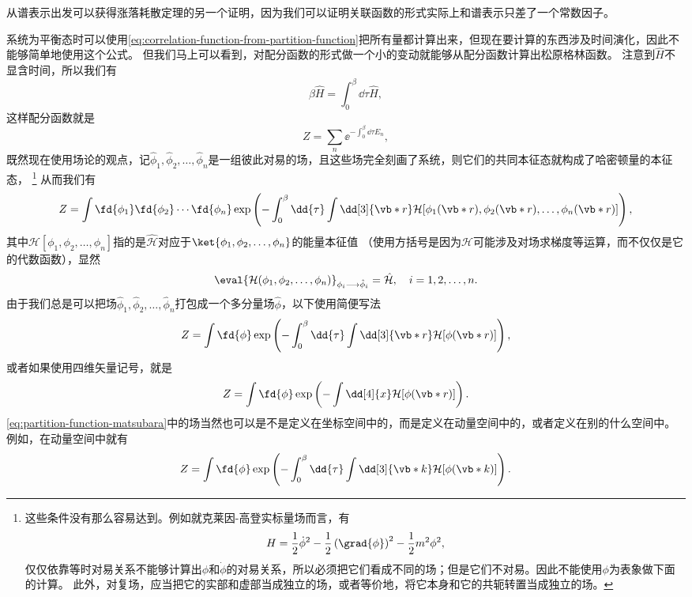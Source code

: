 从谱表示出发可以获得涨落耗散定理的另一个证明，因为我们可以证明关联函数的形式实际上和谱表示只差了一个常数因子。


系统为平衡态时可以使用\eqref{eq:correlation-function-from-partition-function}把所有量都计算出来，但现在要计算的东西涉及时间演化，因此不能够简单地使用这个公式。
但我们马上可以看到，对配分函数的形式做一个小的变动就能够从配分函数计算出松原格林函数。
注意到$\hat{H}$不显含时间，所以我们有
\[
    \beta \hat{H} = \int_0^\beta \dd{\tau} \hat{H},
\]
这样配分函数就是
\[
    Z = \sum_n \ee^{- \int_0^\beta \dd{\tau} E_n},
\]
既然现在使用场论的观点，记$\hat{\phi}_1, \hat{\phi}_2, \ldots, \hat{\phi}_n$是一组彼此对易的场，且这些场完全刻画了系统，则它们的共同本征态就构成了哈密顿量的本征态，%
\footnote{这些条件没有那么容易达到。例如就克莱因-高登实标量场而言，有
\[
    H = \frac{1}{2} \dot{\phi}^2 - \frac{1}{2} \left( \grad{\phi} \right)^2 - \frac{1}{2} m^2 \phi^2,
\]
仅仅依靠等时对易关系不能够计算出$\phi$和$\dot{\phi}$的对易关系，所以必须把它们看成不同的场；但是它们不对易。因此不能使用$\phi$为表象做下面的计算。
此外，对复场，应当把它的实部和虚部当成独立的场，或者等价地，将它本身和它的共轭转置当成独立的场。
}%
从而我们有
\begin{equation}
    Z = \int \fd{\phi_1} \fd{\phi_2} \cdots \fd{\phi_n}  \exp \left( - \int_0^\beta \dd{\tau} \int \dd[3]{\vb*{r}} \mathcal{H}[\phi_1(\vb*{r}), \phi_2(\vb*{r}), \ldots, \phi_n(\vb*{r})] \right),
\end{equation}
其中$\mathcal{H}[\phi_1, \phi_2, \ldots, \phi_n]$指的是$\hat{\mathcal{H}}$对应于$\ket{\phi_1, \phi_2, \ldots, \phi_n}$的能量本征值
（使用方括号是因为$\mathcal{H}$可能涉及对场求梯度等运算，而不仅仅是它的代数函数），显然
\[
    \eval{\mathcal{H}(\phi_1, \phi_2, \ldots, \phi_n)}_{\phi_i \longrightarrow \hat{\phi}_i} = \hat{\mathcal{H}}, \quad i = 1, 2, \ldots, n.
\]
由于我们总是可以把场$\hat{\phi}_1, \hat{\phi}_2, \ldots, \hat{\phi}_n$打包成一个多分量场$\hat{\phi}$，以下使用简便写法
\begin{equation}
    Z = \int \fd{\phi } \exp \left( - \int_0^\beta \dd{\tau} \int \dd[3]{\vb*{r}} \mathcal{H}[\phi(\vb*{r})] \right),
    \label{eq:partition-function-matsubara}
\end{equation}
或者如果使用四维矢量记号，就是
\begin{equation}
    Z = \int \fd{\phi } \exp \left( - \int \dd[4]{x} \mathcal{H}[\phi(\vb*{r})] \right).
\end{equation}
\eqref{eq:partition-function-matsubara}中的场当然也可以是不是定义在坐标空间中的，而是定义在动量空间中的，或者定义在别的什么空间中。
例如，在动量空间中就有
\begin{equation}
    Z = \int \fd{\phi} \exp \left( - \int_0^\beta \dd{\tau} \int \dd[3]{\vb*{k}} \mathcal{H}[\phi(\vb*{k})] \right).
\end{equation}

